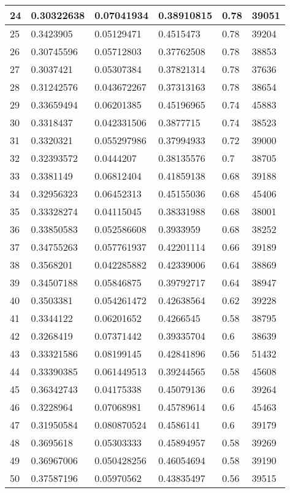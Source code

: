 \begin{longtable}{|l|l|l|l|l|l|}
24 & 0.30322638 & 0.07041934 & 0.38910815 & 0.78 & 39051 \\ \hline 
25 & 0.3423905 & 0.05129471 & 0.4515473 & 0.78 & 39204 \\ \hline 
26 & 0.30745596 & 0.05712803 & 0.37762508 & 0.78 & 38853 \\ \hline 
27 & 0.3037421 & 0.05307384 & 0.37821314 & 0.78 & 37636 \\ \hline 
28 & 0.31242576 & 0.043672267 & 0.37313163 & 0.78 & 38654 \\ \hline 
29 & 0.33659494 & 0.06201385 & 0.45196965 & 0.74 & 45883 \\ \hline 
30 & 0.3318437 & 0.042331506 & 0.3877715 & 0.74 & 38523 \\ \hline 
31 & 0.3320321 & 0.055297986 & 0.37994933 & 0.72 & 39000 \\ \hline 
32 & 0.32393572 & 0.0444207 & 0.38135576 & 0.7 & 38705 \\ \hline 
33 & 0.3381149 & 0.06812404 & 0.41859138 & 0.68 & 39188 \\ \hline 
34 & 0.32956323 & 0.06452313 & 0.45155036 & 0.68 & 45406 \\ \hline 
35 & 0.33328274 & 0.04115045 & 0.38331988 & 0.68 & 38001 \\ \hline 
36 & 0.33850583 & 0.052586608 & 0.3933959 & 0.68 & 38252 \\ \hline 
37 & 0.34755263 & 0.057761937 & 0.42201114 & 0.66 & 39189 \\ \hline 
38 & 0.3568201 & 0.042285882 & 0.42339006 & 0.64 & 38869 \\ \hline 
39 & 0.34507188 & 0.05846875 & 0.39792717 & 0.64 & 38947 \\ \hline 
40 & 0.3503381 & 0.054261472 & 0.42638564 & 0.62 & 39228 \\ \hline 
41 & 0.3344122 & 0.06201652 & 0.4266545 & 0.58 & 38795 \\ \hline 
42 & 0.3268419 & 0.07371442 & 0.39335704 & 0.6 & 38639 \\ \hline 
43 & 0.33321586 & 0.08199145 & 0.42841896 & 0.56 & 51432 \\ \hline 
44 & 0.33390385 & 0.061449513 & 0.39244565 & 0.58 & 45608 \\ \hline 
45 & 0.36342743 & 0.04175338 & 0.45079136 & 0.6 & 39264 \\ \hline 
46 & 0.3228964 & 0.07068981 & 0.45789614 & 0.6 & 45463 \\ \hline 
47 & 0.31950584 & 0.080870524 & 0.4586141 & 0.6 & 39179 \\ \hline 
48 & 0.3695618 & 0.05303333 & 0.45894957 & 0.58 & 39269 \\ \hline 
49 & 0.36967006 & 0.050428256 & 0.46054694 & 0.58 & 39190 \\ \hline 
50 & 0.37587196 & 0.05970562 & 0.43835497 & 0.56 & 39515 \\ \hline 
\end{longtable}